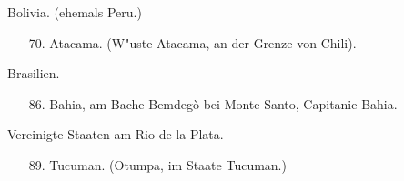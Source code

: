 \documentclass[a4paper, 11pt, oneside, polutonikogreek, german]{article}
\begin{document}
\begin{center}
Bolivia. (ehemals Peru.)
\end{center}
\begin{itemize}
    \small
    \item[70.] Atacama. (W"uste Atacama, an der Grenze von Chili).
\end{itemize}
\begin{center}
Brasilien.
\end{center}
\begin{itemize}
    \small
    \item[86.] Bahia, am Bache Bemdegò bei Monte Santo, Capitanie Bahia.
\end{itemize}
\begin{center}
Vereinigte Staaten am Rio de la Plata.
\end{center}
\begin{itemize}
    \small
    \item[89.] Tucuman. (Otumpa, im Staate Tucuman.)
\end{itemize}
\clearpage
\end{document}
